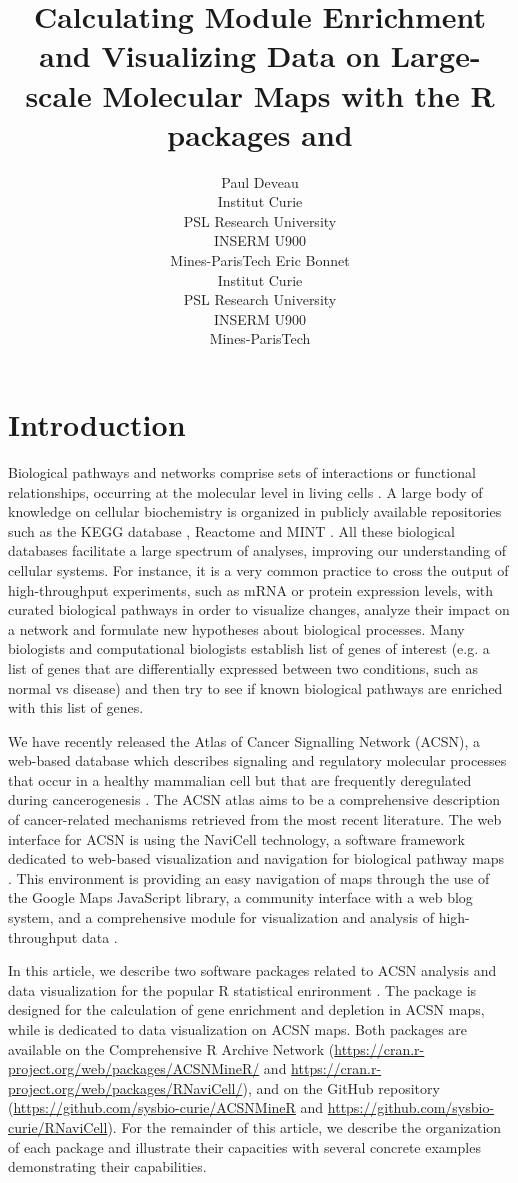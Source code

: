 \documentclass[article]{jss}
\author{Paul Deveau\\Institut Curie\\PSL Research University\\INSERM U900\\Mines-ParisTech \And 
        Eric Bonnet\\Institut Curie\\PSL Research University\\INSERM U900\\Mines-ParisTech}
\title{Calculating Module Enrichment and Visualizing Data on Large-scale Molecular Maps with the R packages \pkg{ACSNMineR} and \pkg{RNaviCell}}
\begin{document}

\section[Introduction]{Introduction}
Biological pathways and networks comprise sets of interactions or functional
relationships, occurring at the molecular level in living cells
\citep{adriaens2008public}.  A large body of knowledge on cellular biochemistry
is organized in publicly available repositories such as the KEGG database
\citep{kanehisa2011kegg}, Reactome \citep{croft2014reactome} and MINT
\citep{zanzoni2002mint}. All these biological databases facilitate a large
spectrum of analyses, improving our understanding of cellular systems. For
instance, it is a very common practice to cross the output of high-throughput
experiments, such as mRNA or protein expression levels, with curated biological
pathways in order to visualize changes, analyze their impact on a network and
formulate new hypotheses about biological processes. Many biologists and
computational biologists establish list of genes of interest (e.g. a list of
genes that are differentially expressed between two conditions, such as normal
vs disease) and then try to see if known biological pathways are enriched with
this list of genes. 

We have recently released the Atlas of Cancer Signalling Network (ACSN), a
web-based database which describes signaling and regulatory molecular processes
that occur in a healthy mammalian cell but that are frequently deregulated
during cancerogenesis \citep{kuperstein2013navicell}.  The ACSN atlas aims to
be a comprehensive description of cancer-related mechanisms retrieved from the
most recent literature. The web interface for ACSN is using the NaviCell
technology, a software framework dedicated to web-based visualization and
navigation for biological pathway maps \citep{kuperstein2013navicell}. This
environment is providing an easy navigation of maps through the use of the
Google Maps JavaScript library, a community interface with a web blog system,
and a comprehensive module for visualization and analysis of high-throughput
data \citep{bonnet2015navicell}.


In this article, we describe two software packages related to ACSN analysis and
data visualization for the popular R statistical enrironment \citep{mainRref,
vance2009data}. The package  is designed for the calculation of
gene enrichment and depletion in ACSN maps, while  is dedicated
to data visualization on ACSN maps. Both packages are available on the
Comprehensive R Archive Network
(\url{https://cran.r-project.org/web/packages/ACSNMineR/} and
\url{https://cran.r-project.org/web/packages/RNaviCell/}), and on the GitHub
repository (\url{https://github.com/sysbio-curie/ACSNMineR} and
\url{https://github.com/sysbio-curie/RNaviCell}). For the remainder of this
article, we describe the organization of each package and illustrate their
capacities with several concrete examples demonstrating their capabilities. 
\end{document}
